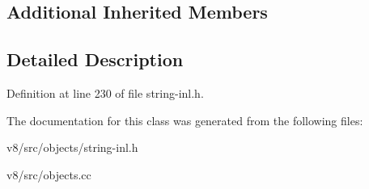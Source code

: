 \subsection*{Additional Inherited Members}


\subsection{Detailed Description}


Definition at line 230 of file string-\/inl.\+h.



The documentation for this class was generated from the following files\+:\begin{DoxyCompactItemize}
\item 
v8/src/objects/string-\/inl.\+h\item 
v8/src/objects.\+cc\end{DoxyCompactItemize}
